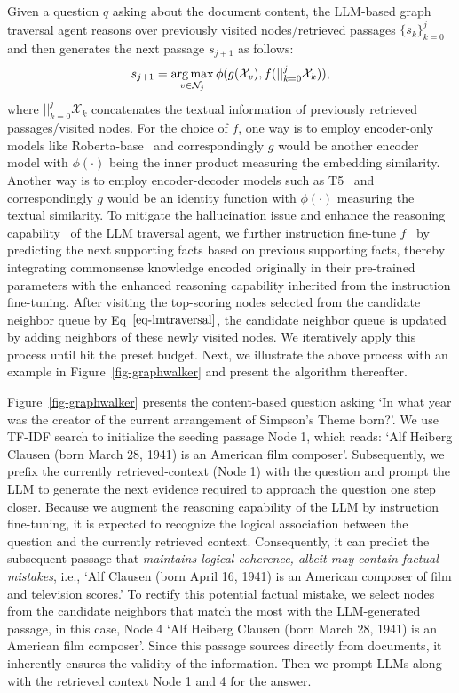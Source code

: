 Given a question $q$ asking about the document content, the LLM-based graph traversal agent reasons over previously visited nodes/retrieved passages $\{s_k\}_{k = 0}^j$ and then generates the next passage $s_{j + 1}$ as follows:
\begin{equation}\label{eq-lmtraversal}
    s_{j + 1} = \operatorname*{arg\,max}_{v \in \mathcal{N}_{j}}
    \phi(g(\mathcal{X}_v), f(||_{k = 0}^{j}\mathcal{X}_k)),
\end{equation}
where $||_{k = 0}^{j}\mathcal{X}_k$ concatenates the textual information of previously retrieved passages/visited nodes. For the choice of $f$, one way is to employ encoder-only models like Roberta-base~\cite{asai2019learning, xiong2020answering, yavuz2022modeling} and correspondingly $g$ would be another encoder model with $\phi(\cdot)$ being the inner product measuring the embedding similarity. Another way is to employ encoder-decoder models such as T5~\cite{brown2020language, touvron2023llama} and correspondingly $g$ would be an identity function with $\phi(\cdot)$ measuring the textual similarity. To mitigate the hallucination issue and enhance the reasoning capability~\cite{wei2022chain, ji2023survey} of the LLM traversal agent, we further instruction fine-tune $f$~\cite{chung2022scaling} by predicting the next supporting facts based on previous supporting facts, thereby integrating commonsense knowledge encoded originally in their pre-trained parameters with the enhanced reasoning capability inherited from the instruction fine-tuning. After visiting the top-scoring nodes selected from the candidate neighbor queue by Eq~$\eqref{eq-lmtraversal}$, the candidate neighbor queue is updated by adding neighbors of these newly visited nodes. We iteratively apply this process until hit the preset budget. Next, we illustrate the above process with an example in Figure~\ref{fig-graphwalker} and present the algorithm thereafter.


 

Figure~\ref{fig-graphwalker} presents the content-based question asking `In what year was the creator of the current arrangement of Simpson's Theme born?'. We use TF-IDF search to initialize the seeding passage Node 1, which reads: `Alf Heiberg Clausen (born March 28, 1941) is an American film composer'. Subsequently, we prefix the currently retrieved-context (Node 1) with the question and prompt the LLM to generate the next evidence required to approach the question one step closer. Because we augment the reasoning capability of the LLM by instruction fine-tuning, it is expected to recognize the logical association between the question and the currently retrieved context. Consequently, it can predict the subsequent passage that \textit{maintains logical coherence, albeit may contain factual mistakes}, i.e., `Alf Clausen (born April 16, 1941) is an American composer of film and television scores.' To rectify this potential factual mistake, we select nodes from the candidate neighbors that match the most with the LLM-generated passage, in this case, Node 4 `Alf Heiberg Clausen (born March 28, 1941) is an American film composer'. Since this passage sources directly from documents, it inherently ensures the validity of the information. Then we prompt LLMs along with the retrieved context Node 1 and 4 for the answer.


